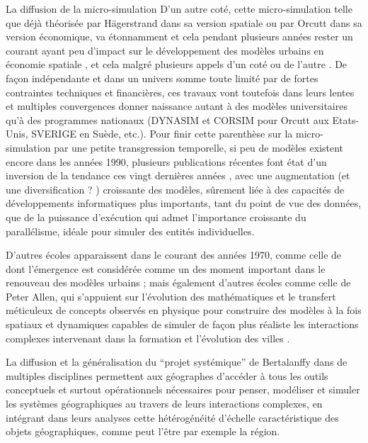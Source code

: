 \begin{testiv}{La diffusion de la micro-simulation}{}
D'un autre coté, cette micro-simulation telle que déjà théorisée par Hägerstrand dans sa version spatiale ou par Orcutt dans sa version économique, va étonnamment et cela pendant plusieurs années rester un courant ayant peu d'impact sur le développement des modèles urbains en économie spatiale \autocite[5]{Sanders2006}, et cela malgré plusieurs appels d'un coté \autocite{Hagerstrand1970} ou de l'autre \autocite[5]{Isard1998}. De façon indépendante et dans un univers somme toute limité par de fortes contraintes techniques et financières, ces travaux vont toutefois dans leurs lentes et multiples convergences donner naissance autant à des modèles universitaires qu'à des programmes nationaux (DYNASIM et CORSIM pour Orcutt aux Etats-Unis, SVERIGE en Suède, etc.). Pour finir cette parenthèse sur la micro-simulation par une petite transgression temporelle, si peu de modèles existent encore dans les années 1990, plusieurs publications récentes font état d'un inversion de la tendance ces vingt dernières années \autocite{Lenormand2013}, avec une augmentation (et une diversification ? ) croissante des modèles, sûrement liée à des capacités de développements informatiques plus importants, tant du point de vue des données, que de la puissance d’exécution qui admet l'importance croissante du parallélisme, idéale pour simuler des entités individuelles. \autocites[5]{Sanders2006}{Lenormand2013}

\end{testiv}

D'autres écoles apparaissent dans le courant des années 1970, comme celle de \textcite{Wilson1970} dont l'émergence est considérée comme un des moment important dans le renouveau des modèles urbains \autocite{Griffith2010}; mais également d'autres écoles comme celle de Peter Allen, qui s'appuient sur l'évolution des mathématiques et le transfert méticuleux de concepts observés en physique pour construire des modèles à la fois spatiaux et dynamiques capables de simuler de façon plus réaliste les interactions complexes intervenant dans la formation et l'évolution des villes \autocites[11]{Batty1976}{Batty2001}[27-28]{Pumain2003} .  

La diffusion et la généralisation du \enquote{projet systémique} de Bertalanffy dans de multiples disciplines permettent aux géographes d'accéder à tous les outils conceptuels et surtout opérationnels \autocite{Forrester1969} nécessaires pour penser, modéliser et simuler les systèmes géographiques au travers de leurs interactions complexes, en intégrant dans leurs analyses cette hétérogénéité d'échelle caractéristique des objets géographiques, comme peut l'être par exemple la région. 

